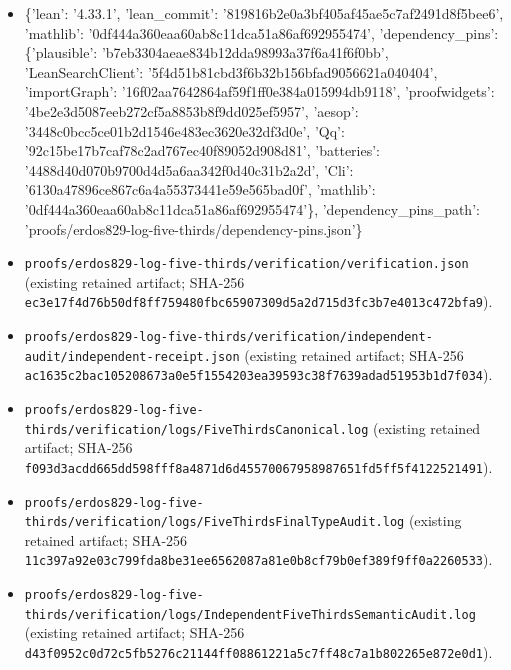 \documentclass[11pt,a4paper]{article}
\begin{document}
\begin{itemize}
\item \{'lean': '4.33.1', 'lean\_commit': '819816b2e0a3bf405af45ae5c7af2491d8f5bee6', 'mathlib': '0df444a360eaa60ab8c11dca51a86af692955474', 'dependency\_pins': \{'plausible': 'b7eb3304aeae834b12dda98993a37f6a41f6f0bb', 'LeanSearchClient': '5f4d51b81cbd3f6b32b156bfad9056621a040404', 'importGraph': '16f02aa7642864af59f1ff0e384a015994db9118', 'proofwidgets': '4be2e3d5087eeb272cf5a8853b8f9dd025ef5957', 'aesop': '3448c0bcc5ce01b2d1546e483ec3620e32df3d0e', 'Qq': '92c15be17b7caf78c2ad767ec40f89052d908d81', 'batteries': '4488d40d070b9700d4d5a6aa342f0d40c31b2a2d', 'Cli': '6130a47896ce867c6a4a55373441e59e565bad0f', 'mathlib': '0df444a360eaa60ab8c11dca51a86af692955474'\}, 'dependency\_pins\_path': 'proofs/erdos829-log-five-thirds/dependency-pins.json'\}
\end{itemize}
\begin{itemize}
\item \texttt{proofs/erdos829-log-five-thirds/verification/verification.json} (existing retained artifact; SHA-256 \texttt{ec3e17f4d76b50df8ff759480fbc65907309d5a2d715d3fc3b7e4013c472bfa9}).
\end{itemize}
\begin{itemize}
\item \texttt{proofs/erdos829-log-five-thirds/verification/independent-audit/independent-receipt.json} (existing retained artifact; SHA-256 \texttt{ac1635c2bac105208673a0e5f1554203ea39593c38f7639adad51953b1d7f034}).
\end{itemize}
\begin{itemize}
\item \texttt{proofs/erdos829-log-five-thirds/verification/logs/FiveThirdsCanonical.log} (existing retained artifact; SHA-256 \texttt{f093d3acdd665dd598fff8a4871d6d45570067958987651fd5ff5f4122521491}).
\end{itemize}
\begin{itemize}
\item \texttt{proofs/erdos829-log-five-thirds/verification/logs/FiveThirdsFinalTypeAudit.log} (existing retained artifact; SHA-256 \texttt{11c397a92e03c799fda8be31ee6562087a81e0b8cf79b0ef389f9ff0a2260533}).
\end{itemize}
\begin{itemize}
\item \texttt{proofs/erdos829-log-five-thirds/verification/logs/IndependentFiveThirdsSemanticAudit.log} (existing retained artifact; SHA-256 \texttt{d43f0952c0d72c5fb5276c21144ff08861221a5c7ff48c7a1b802265e872e0d1}).
\end{itemize}
\end{document}
